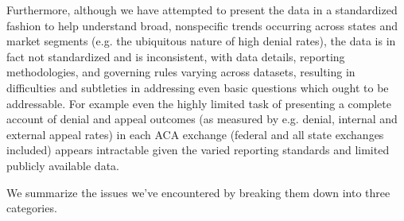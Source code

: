 \documentclass[12pt, a4paper,twoside,parskip=full]{report}
\theoremstyle{plain} %
\theoremstyle{definition} %
\theoremstyle{remark} %
\numberwithin{equation}{chapter}
\begin{document}
		Furthermore, although we have attempted to present the data in a standardized fashion to help understand broad, nonspecific 
		trends occurring across states and market segments (e.g. the ubiquitous nature of high denial rates), 
		the data is in fact not standardized and is inconsistent, with data details, reporting methodologies, and governing rules 
		varying across datasets, resulting in difficulties and subtleties in addressing even basic questions
		which ought to be addressable. For example even the highly limited task of presenting a complete account 
		of denial and appeal outcomes (as measured by e.g. denial, internal and external appeal rates) in each 
		ACA exchange (federal and all state exchanges included) appears intractable given the varied reporting standards and 
		limited publicly available data.
		
		We summarize the issues we've encountered by breaking them down into three categories.
		
\end{document}
